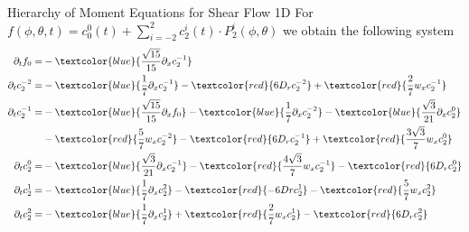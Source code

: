 \begin{frame}{Hierarchy of Moment Equations for Shear Flow 1D}
	\scriptsize
	For  $f(\phi, \theta, t) = c^0_0(t) + \sum_{i=-2}^{2} c^i_{2}(t) \cdot P^i_{2}(\phi, \theta)$ we obtain the following system
	\begin{align*}
		\partial_{t} f_0 = &-\textcolor{blue}{\frac{\sqrt{15}}{15}\partial_x c^{-1}_2}\\
		\partial_{t} c^{-2}_2 = &-\textcolor{blue}{\frac{1}{7} \partial_x c^{-1}_2} -\textcolor{red}{6D_rc^{-2}_2}+ \textcolor{red}{\frac{2}{7}w_xc^{-1}_2} \\
		\partial_{t} c^{-1}_2 = &-\textcolor{blue}{\frac{\sqrt{15}}{15}\partial_x f_0} - \textcolor{blue}{\frac{1}{7} \partial_x c^{-2}_2} - \textcolor{blue}{\frac{\sqrt{3}}{21}\partial_x c^0_2} \\ &-\textcolor{red}{\frac{5}{7}w_x c^{-2}_2} -\textcolor{red}{6D_r c^{-1}_2} +\textcolor{red}{\frac{3\sqrt{3}}{7}w_x c^0_2} \\
		\partial_{t} c^0_2 = &-\textcolor{blue}{\frac{\sqrt{3}}{21}\partial_x c^{-1}_2} -\textcolor{red}{\frac{4\sqrt{3}}{7}w_x c^{-1}_2} -\textcolor{red}{6D_r c^0_2} \\
		\partial_{t} c^1_2 = &-\textcolor{blue}{\frac{1}{7}\partial_x c^2_2} -\textcolor{red}{-6Dr c^{1}_2} -\textcolor{red}{\frac{5}{7}w_x c^{2}_2}\\
		\partial_{t} c^2_2 = &-\textcolor{blue}{\frac{1}{7}\partial_x c^1_2} +\textcolor{red}{\frac{2}{7}w_x c^{1}_2} -\textcolor{red}{6D_r c^{2}_2}
	\end{align*}
\end{frame}
